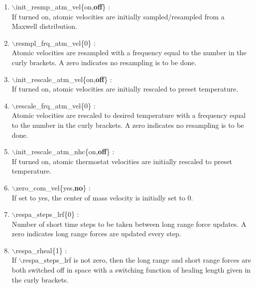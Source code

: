 \documentclass[12pt]{article}
\begin{document}
\begin{enumerate}
 \vspace{0.15in}
 \item   $\backslash$init\_resmp\_atm\_vel\{on,{\bf off}\} : \\
     If turned on, atomic velocities are initially sampled/resampled from a 
     Maxwell distribution.


 \vspace{0.15in}
 \item   $\backslash$resmpl\_frq\_atm\_vel\{0\} : \\
     Atomic velocities are resampled with a frequency equal to the number 
     in the curly brackets.  A zero indicates no resampling is to be done.


 \vspace{0.15in}
 \item   $\backslash$init\_rescale\_atm\_vel\{on,{\bf off}\} : \\
    If turned on, atomic velocities are initially rescaled to preset 
    temperature.

 \vspace{0.15in}
 \item   $\backslash$rescale\_frq\_atm\_vel\{0\} : \\
    Atomic velocities are rescaled to desired temperature
    with a frequency equal to the number in the
    curly brackets.  A zero indicates no resampling is to be done.

 \vspace{0.15in} 
 \item   $\backslash$init\_rescale\_atm\_nhc\{on,{\bf off}\} : \\
    If turned on, atomic thermostat velocities are initially rescaled to 
    preset temperature.

 \vspace{0.15in} 
 \item   $\backslash$zero\_com\_vel\{yes,{\bf no}\} : \\
    If set to yes, the center of mass velocity is initially set to 0.

 \vspace{0.15in} 
 \item   $\backslash$respa\_steps\_lrf\{0\} : \\
    Number of short time steps to be taken between long range force updates.
    A zero indicates long range forces are updated every step.

 \vspace{0.15in} 
 \item   $\backslash$respa\_rheal\{1\} : \\
    If $\backslash$respa\_steps\_lrf is not zero, then the long range 
    and short range forces are both switched off in space with a switching
    function of healing length given in the curly brackets.


\end{enumerate}
\end{document}
